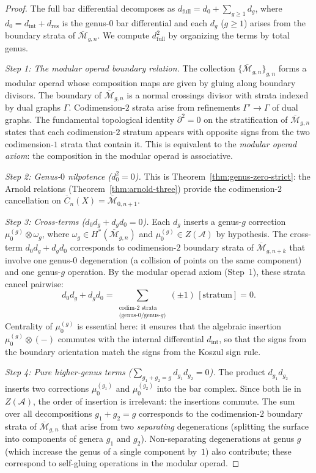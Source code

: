 \begin{proof}
The full bar differential decomposes as
$d_{\mathrm{full}} = d_0 + \sum_{g \geq 1} d_g$,
where $d_0 = d_{\mathrm{int}} + d_{\mathrm{res}}$ is the genus-$0$ bar
differential and each $d_g$ ($g \geq 1$) arises from the boundary strata of
$\overline{\mathcal{M}}_{g,n}$. We compute $d_{\mathrm{full}}^2$ by organizing
the terms by total genus.

\medskip
\emph{Step 1: The modular operad boundary relation.}
The collection $\{\overline{\mathcal{M}}_{g,n}\}_{g,n}$ forms a modular operad
whose composition maps are given by gluing along boundary divisors. The
boundary of $\overline{\mathcal{M}}_{g,n}$ is a normal crossings divisor with
strata indexed by dual graphs $\Gamma$. Codimension-$2$ strata arise from
refinements $\Gamma' \to \Gamma$ of dual graphs. The fundamental topological
identity $\partial^2 = 0$ on the stratification of $\overline{\mathcal{M}}_{g,n}$
states that each codimension-$2$ stratum appears with opposite signs from the two
codimension-$1$ strata that contain it. This is equivalent to the \emph{modular
operad axiom}: the composition in the modular operad is associative.

\medskip
\emph{Step 2: Genus-$0$ nilpotence ($d_0^2 = 0$).}
This is Theorem~\ref{thm:genus-zero-strict}: the Arnold relations
(Theorem~\ref{thm:arnold-three}) provide the codimension-$2$ cancellation on
$\overline{C}_n(X) = \overline{\mathcal{M}}_{0,n+1}$.

\medskip
\emph{Step 3: Cross-terms ($d_0 d_g + d_g d_0 = 0$).}
Each $d_g$ inserts a genus-$g$ correction $\mu_0^{(g)} \otimes \omega_g$,
where $\omega_g \in H^*(\overline{\mathcal{M}}_{g,n})$ and
$\mu_0^{(g)} \in Z(\mathcal{A})$ by hypothesis. The cross-term
$d_0 d_g + d_g d_0$ corresponds to codimension-$2$ boundary strata of
$\overline{\mathcal{M}}_{g,n+k}$ that involve one genus-$0$ degeneration
(a collision of points on the same component) and one genus-$g$ operation.
By the modular operad axiom (Step~1), these strata cancel pairwise:
\[
 d_0 d_g + d_g d_0 = \sum_{\substack{\text{codim-2 strata} \\ \text{(genus-0/genus-$g$)}}}
 (\pm 1)\, [\text{stratum}] = 0.
\]
Centrality of $\mu_0^{(g)}$ is essential here: it ensures that the algebraic
insertion $\mu_0^{(g)} \otimes (-)$ commutes with the internal differential
$d_{\mathrm{int}}$, so that the signs from the boundary orientation match the
signs from the Koszul sign rule.

\medskip
\emph{Step 4: Pure higher-genus terms ($\sum_{g_1 + g_2 = g} d_{g_1} d_{g_2} = 0$).}
The product $d_{g_1} d_{g_2}$ inserts two corrections
$\mu_0^{(g_1)}$ and $\mu_0^{(g_2)}$ into the bar complex. Since both lie in
$Z(\mathcal{A})$, the order of insertion is irrelevant: the insertions commute.
The sum over all decompositions $g_1 + g_2 = g$ corresponds to the codimension-$2$
boundary strata of $\overline{\mathcal{M}}_{g,n}$ that arise from two
\emph{separating} degenerations (splitting the surface into components of genera
$g_1$ and $g_2$). Non-separating degenerations at genus $g$ (which increase the
genus of a single component by~$1$) also contribute; these correspond to
self-gluing operations in the modular operad.


\end{proof}
